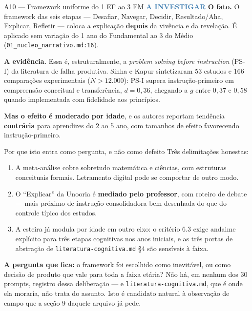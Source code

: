 \documentclass[11pt,a4paper]{article}
\newcommand{\sevinv}{\textcolor{SteelBlue}{\textbf{A INVESTIGAR}}}
\begin{document}
\begin{achadobox}{A10 --- Framework uniforme do 1\textordmasculine{} EF ao 3\textordmasculine{} EM \hfill \sevinv}
\textbf{O fato.} O framework das seis etapas --- Desafiar, Navegar, Decidir, Resultado/Aha,
Explicar, Refletir --- coloca a explica\c{c}\~ao \textbf{depois} da viv\^encia e da revela\c{c}\~ao.
\'E aplicado sem varia\c{c}\~ao do 1\textordmasculine{} ano do Fundamental ao
3\textordmasculine{} do M\'edio (\texttt{01\_nucleo\_narrativo.md:16}).

\textbf{A evid\^encia.} Essa \'e, estruturalmente, a \emph{problem solving before instruction}
(PS-I) da literatura de falha produtiva. Sinha e Kapur \cite{sinha2021} sintetizaram 53 estudos e
166 compara\c{c}\~oes experimentais ($N > 12.000$): PS-I supera instru\c{c}\~ao-primeiro em
compreens\~ao conceitual e transfer\^encia, $d = 0{,}36$, chegando a $g$ entre $0{,}37$ e $0{,}58$
quando implementada com fidelidade aos princ\'ipios.

\textbf{Mas o efeito \'e moderado por idade}, e os autores reportam tend\^encia \textbf{contr\'aria}
para aprendizes do 2\textordmasculine{} ao 5\textordmasculine{} ano, com tamanhos de efeito
favorecendo instru\c{c}\~ao-primeiro.

\begin{notabox}{Por que isto entra como pergunta, e n\~ao como defeito}
Tr\^es delimita\c{c}\~oes honestas:
\begin{enumerate}
  \item A meta-an\'alise cobre sobretudo matem\'atica e ci\^encias, com estruturas conceituais
        formais. Letramento digital pode se comportar de outro modo.
  \item O ``Explicar'' da Unooria \'e \textbf{mediado pelo professor}, com roteiro de debate ---
        mais pr\'oximo de instru\c{c}\~ao consolidadora bem desenhada do que do controle t\'ipico
        dos estudos.
  \item A esteira j\'a modula por idade em outro eixo: o crit\'erio 6.3 exige andaime expl\'icito
        para tr\^es etapas cognitivas nos anos iniciais, e as tr\^es portas de abstra\c{c}\~ao de
        \texttt{literatura-cognitiva.md} \S4 s\~ao sens\'iveis \`a faixa.
\end{enumerate}

\textbf{A pergunta que fica:} o framework foi escolhido como inevit\'avel, ou como decis\~ao de
produto que vale para toda a faixa et\'aria? N\~ao h\'a, em nenhum dos 30 prompts, registro dessa
delibera\c{c}\~ao --- e \texttt{literatura-cognitiva.md}, que \'e onde ela moraria, n\~ao trata do
assunto. Isto \'e candidato natural \`a observa\c{c}\~ao de campo que a se\c{c}\~ao 9 daquele
arquivo j\'a pede.
\end{notabox}
\end{achadobox}
\end{document}
